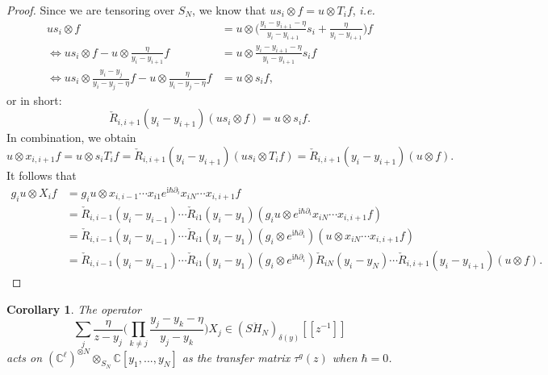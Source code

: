 \documentclass[11pt]{report}
\newtheorem{corollary}[theorem]{Corollary}
\theoremstyle{definition}
\theoremstyle{remark}
\theoremstyle{remark}
\newcommand{\C}{\mathbb{C}}
\newcommand{\I}{\mathrm{i}}
\begin{document}
\begin{proof}
Since we are tensoring over $S_N$, we know that $u s_i \otimes f = u \otimes T_i f$, \emph{i.e.}
\begin{align*}
us_i  \otimes f &= u \otimes \bigg( \frac{y_i-y_{i+1}-\eta}{y_i-y_{i+1}} s_i + \frac{\eta}{y_i-y_{i+1}} \bigg) f \\
\Leftrightarrow u s_i \otimes f - u \otimes \frac{\eta}{y_i-y_{i+1}} f &= u \otimes \frac{y_i-y_{i+1}-\eta}{y_i-y_{i+1}} s_i f \\
\Leftrightarrow u s_i \otimes \frac{y_i-y_j}{y_i-y_j-\eta} f - u \otimes \frac{\eta}{y_i-y_j-\eta} f &= u \otimes s_i f,
\end{align*}
or in short:
\begin{equation*}
\check R_{i,i+1}(y_i-y_{i+1}) (u s_i \otimes f) = u \otimes s_i f.
\end{equation*}
In combination, we obtain
\begin{equation*}
u \otimes x_{i,i+1} f = u \otimes s_i T_i f = \check R_{i,i+1}(y_i-y_{i+1}) (u s_i \otimes T_i f) = \check R_{i,i+1}(y_i-y_{i+1})(u \otimes f).
\end{equation*}
It follows that
\begin{align*}
g_i u \otimes X_i f
&= g_i u \otimes x_{i,i-1} \cdots x_{i1} e^{\I \hbar \partial_i} x_{iN} \cdots x_{i,i+1} f \\
&= \check R_{i,i-1}(y_i-y_{i-1}) \cdots \check R_{i1}(y_i-y_1) (g_i u \otimes e^{\I \hbar \partial_i} x_{iN} \cdots x_{i,i+1} f) \\
&= \check R_{i,i-1}(y_i-y_{i-1}) \cdots \check R_{i1}(y_i-y_1) (g_i \otimes e^{\I \hbar \partial_i}) (u \otimes x_{iN} \cdots x_{i,i+1} f) \\
&= \check R_{i,i-1}(y_i-y_{i-1}) \cdots \check R_{i1}(y_i-y_1) (g_i \otimes e^{\I \hbar \partial_i}) \check R_{iN}(y_i-y_N) \cdots \check R_{i,i+1}(y_i-y_{i+1}) (u \otimes f).
\end{align*}
\end{proof}

\begin{corollary}
The operator
\begin{equation*}
\sum_j \frac{\eta}{z-y_j} \bigg( \prod_{k \neq j} \frac{y_j-y_k-\eta}{y_j-y_k} \bigg) X_j \in (S\ddot H_N)_{\delta(y)}[[z^{-1}]]
\end{equation*}
acts on $(\C^\ell)^{\otimes N} \otimes_{S_N} \C[y_1,...,y_N]$ as the transfer matrix $\tau^g(z)$ when $\hbar = 0$.
\end{corollary}
\end{document}
